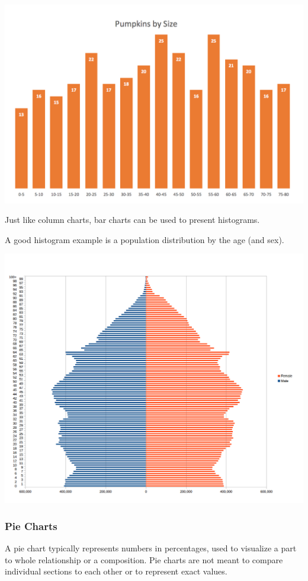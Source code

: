 \documentclass[]{book}
\begin{document}
\includegraphics{images/histogram-diag.png}

Just like column charts, bar charts can be used to present histograms.

A good histogram example is a population distribution by the age (and sex).

\includegraphics{images/bar-hist-diag.png}

\hypertarget{pie-charts}{%
\subsubsection{Pie Charts}\label{pie-charts}}

A pie chart typically represents numbers in percentages, used to visualize a part to whole relationship or a composition. Pie charts are not meant to compare individual sections to each other or to represent exact values.
\end{document}
